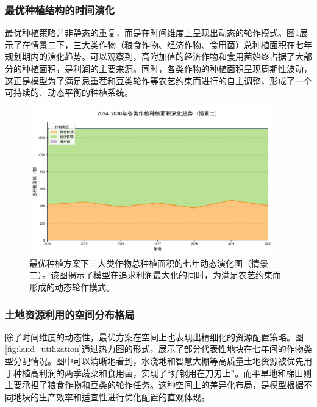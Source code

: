 
\subsubsection{最优种植结构的时间演化}

最优种植策略并非静态的重复，而是在时间维度上呈现出动态的轮作模式。图\ref{fig:portfolio_evolution}展示了在情景二下，三大类作物（粮食作物、经济作物、食用菌）总种植面积在七年规划期内的演化趋势。可以观察到，高附加值的经济作物和食用菌始终占据了大部分的种植面积，是利润的主要来源。同时，各类作物的种植面积呈现周期性波动，这正是模型为了满足忌重茬和豆类轮作等农艺约束而进行的自主调整，形成了一个可持续的、动态平衡的种植系统。

\begin{figure}[htbp]
    \centering
    \includegraphics[width=0.95\textwidth]{figs/3问题一/portfolio_evolution.png}
    \caption{最优种植方案下三大类作物总种植面积的七年动态演化图（情景二）。该图揭示了模型在追求利润最大化的同时，为满足农艺约束而形成的动态轮作模式。}
    \label{fig:portfolio_evolution}
\end{figure}

\subsubsection{土地资源利用的空间分布格局}

除了时间维度的动态性，最优方案在空间上也表现出精细化的资源配置策略。图\ref{fig:land_utilization}通过热力图的形式，展示了部分代表性地块在七年间的作物类型分配情况。图中可以清晰地看到，水浇地和智慧大棚等高质量土地资源被优先用于种植高利润的两季蔬菜和食用菌，实现了“好钢用在刀刃上”。而平旱地和梯田则主要承担了粮食作物和豆类的轮作任务。这种空间上的差异化布局，是模型根据不同地块的生产效率和适宜性进行优化配置的直观体现。

